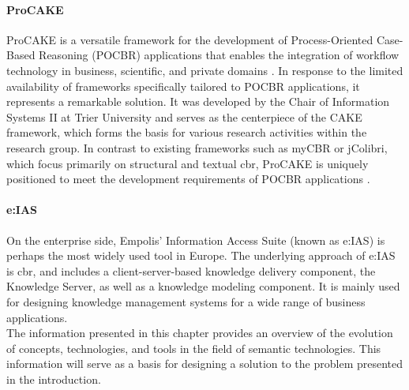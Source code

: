         
            \paragraph{ProCAKE}
            ProCAKE is a versatile framework for the development of Process-Oriented Case-Based Reasoning (POCBR) applications that enables the integration of workflow technology in business, scientific, and private domains \cite{bergmann2019procake}. In response to the limited availability of frameworks specifically tailored to POCBR applications, it represents a remarkable solution. It was developed by the Chair of Information Systems II at Trier University and serves as the centerpiece of the CAKE framework, which forms the basis for various research activities within the research group. In contrast to existing frameworks such as myCBR or jColibri, which focus primarily on structural and textual \acrshort{cbr}, ProCAKE is uniquely positioned to meet the development requirements of POCBR applications \cite{bergmann2019procake, bergmann2014collaborative}.


            \paragraph{e:IAS}
            On the enterprise side, Empolis' Information Access Suite (known as e:IAS) \cite{hanft2008realising} is perhaps the most widely used tool in Europe. The underlying approach of e:IAS is \acrshort{cbr}, and includes a client-server-based knowledge delivery component, the Knowledge Server, as well as a knowledge modeling component. It is mainly used for designing knowledge management systems for a wide range of business applications.\\
            
            
            
The information presented in this chapter provides an overview of the evolution of concepts, technologies, and tools in the field of semantic technologies. This information will serve as a basis for designing a solution to the problem presented in the introduction.